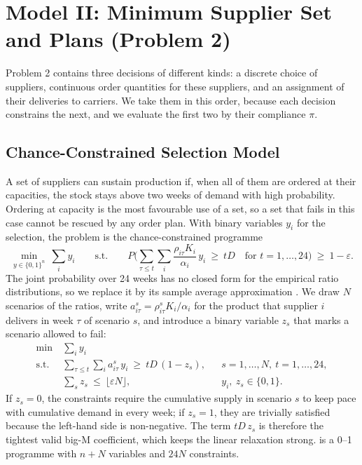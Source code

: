 \documentclass[11pt,a4paper]{article}
\begin{document}
\section{Model II: Minimum Supplier Set and Plans (Problem 2)}\label{sec:q2}

Problem 2 contains three decisions of different kinds: a discrete choice of suppliers, continuous order quantities for these suppliers, and an assignment of their deliveries to carriers.
We take them in this order, because each decision constrains the next, and we evaluate the first two by their compliance $\pi$.

\subsection{Chance-Constrained Selection Model}
A set of suppliers can sustain production if, when all of them are ordered at their capacities, the stock stays above two weeks of demand with high probability.
Ordering at capacity is the most favourable use of a set, so a set that fails in this case cannot be rescued by any order plan.
With binary variables $y_i$ for the selection, the problem is the chance-constrained programme
\begin{equation}\label{eq:ccp}
\min_{y\in\{0,1\}^{n}}\ \sum_i y_i\qquad\text{s.t.}\qquad
P\Big(\sum_{\tau\le t}\sum_i \frac{\rho_{i\tau}K_i}{\alpha_i}\,y_i\ \ge\ tD\quad \text{for } t=1,\dots,24\Big)\ \ge\ 1-\varepsilon .
\end{equation}
The joint probability over 24 weeks has no closed form for the empirical ratio distributions, so we replace it by its sample average approximation \citep{luedtke2008}.
We draw $N$ scenarios of the ratios, write $a^s_{i\tau}=\rho^s_{i\tau}K_i/\alpha_i$ for the product that supplier $i$ delivers in week $\tau$ of scenario $s$, and introduce a binary variable $z_s$ that marks a scenario allowed to fail:
\begin{equation}\label{eq:saa}
\begin{aligned}
\min\ & \sum_i y_i\\
\text{s.t.}\ & \sum_{\tau\le t}\sum_i a^s_{i\tau}\,y_i\ \ge\ tD\,(1-z_s), && s=1,\dots,N,\ t=1,\dots,24,\\
& \sum_s z_s\ \le\ \lfloor\varepsilon N\rfloor, && y_i,\ z_s\in\{0,1\}.
\end{aligned}
\end{equation}
If $z_s=0$, the constraints require the cumulative supply in scenario $s$ to keep pace with cumulative demand in every week; if $z_s=1$, they are trivially satisfied because the left-hand side is non-negative.
The term $tD\,z_s$ is therefore the tightest valid big-M coefficient, which keeps the linear relaxation strong.
 is a 0--1 programme with $n+N$ variables and $24N$ constraints.
\end{document}
